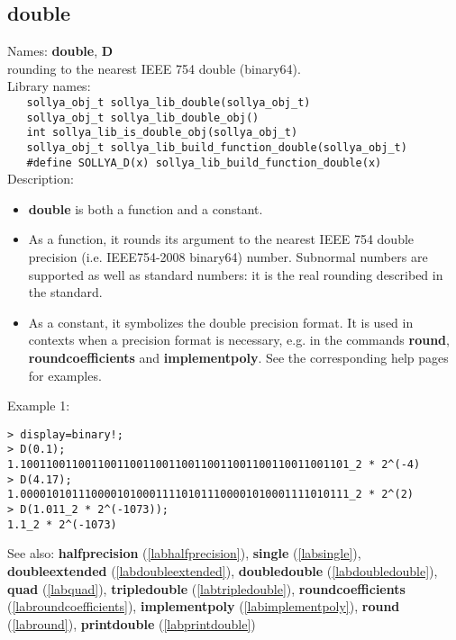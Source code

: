 \subsection{double}
\label{labdouble}
\noindent Names: \textbf{double}, \textbf{D}\\
\phantom{aaa}rounding to the nearest IEEE 754 double (binary64).\\[0.2cm]
\noindent Library names:\\
\verb|   sollya_obj_t sollya_lib_double(sollya_obj_t)|\\
\verb|   sollya_obj_t sollya_lib_double_obj()|\\
\verb|   int sollya_lib_is_double_obj(sollya_obj_t)|\\
\verb|   sollya_obj_t sollya_lib_build_function_double(sollya_obj_t)|\\
\verb|   #define SOLLYA_D(x) sollya_lib_build_function_double(x)|\\[0.2cm]
\noindent Description: \begin{itemize}

\item \textbf{double} is both a function and a constant.

\item As a function, it rounds its argument to the nearest IEEE 754 double precision (i.e. IEEE754-2008 binary64) number.
   Subnormal numbers are supported as well as standard numbers: it is the real
   rounding described in the standard.

\item As a constant, it symbolizes the double precision format. It is used in 
   contexts when a precision format is necessary, e.g. in the commands 
   \textbf{round}, \textbf{roundcoefficients} and \textbf{implementpoly}.
   See the corresponding help pages for examples.
\end{itemize}
\noindent Example 1: 
\begin{center}\begin{minipage}{15cm}\begin{Verbatim}[frame=single,commandchars=\\\|\~]
> display=binary!;
> D(0.1);
1.100110011001100110011001100110011001100110011001101_2 * 2^(-4)
> D(4.17);
1.000010101110000101000111101011100001010001111010111_2 * 2^(2)
> D(1.011_2 * 2^(-1073));
1.1_2 * 2^(-1073)
\end{Verbatim}
\end{minipage}\end{center}
See also: \textbf{halfprecision} (\ref{labhalfprecision}), \textbf{single} (\ref{labsingle}), \textbf{doubleextended} (\ref{labdoubleextended}), \textbf{doubledouble} (\ref{labdoubledouble}), \textbf{quad} (\ref{labquad}), \textbf{tripledouble} (\ref{labtripledouble}), \textbf{roundcoefficients} (\ref{labroundcoefficients}), \textbf{implementpoly} (\ref{labimplementpoly}), \textbf{round} (\ref{labround}), \textbf{printdouble} (\ref{labprintdouble})
